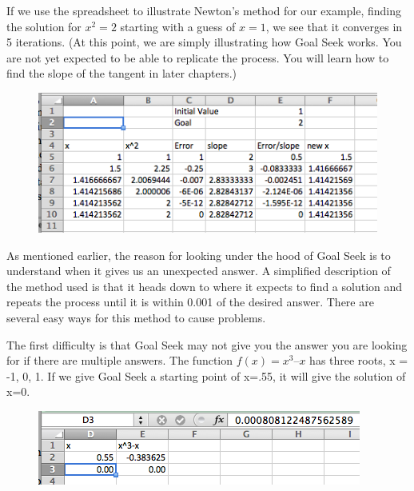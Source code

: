 \documentclass[10pt,]{book}
\theoremstyle{plain}
\theoremstyle{definition}
\theoremstyle{definition}
\begin{document}
%
\par

If we use the spreadsheet to illustrate Newton's method for our example, finding the solution for \(x^2 = 2\) starting with a guess of \(x = 1\), we see that it converges in 5 iterations.  (At this point, we are simply illustrating how Goal Seek works.  You are not yet expected to be able to replicate the process.  You will learn how to find the slope of the tangent in later chapters.)

  \leavevmode%
\begin{figure}
\centering
\includegraphics[width=0.8\linewidth]{images/sec1-6-12.png}
\end{figure}
 

%
\par

As mentioned earlier, the reason for looking under the hood of Goal Seek is to understand when it gives us an unexpected answer.  A simplified description of the method used is that it heads down to where it expects to find a solution and repeats the process until it is within 0.001 of the desired answer.  There are several easy ways for this method to cause problems.%
\par
The first difficulty is that Goal Seek may not give you the answer you are looking for if there are multiple answers.  The function \(f(x) = x^3 – x\) has three roots, x = -1, 0, 1.  If we give Goal Seek a starting point of x=.55, it will give the solution of x=0.

  \leavevmode%
\begin{figure}
\centering
\includegraphics[width=0.8\linewidth]{images/sec1-6-13.png}
\end{figure}
 

%
\par
\end{document}
